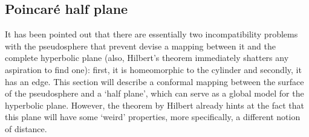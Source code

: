 \subsection{Poincaré half plane}
It has been pointed out that there are essentially two incompatibility problems with the pseudosphere that prevent devise a mapping between it and the complete hyperbolic plane (also, Hilbert's theorem immediately shatters any aspiration to find one): first, it is homeomorphic to the cylinder and secondly, it has an edge. This section will describe a conformal mapping between the surface of the pseudosphere and a `half plane', which can serve as a global model for the hyperbolic plane. However, the theorem by Hilbert already hints at the fact that this plane will have some `weird' properties, more specifically, a different notion of distance. 

